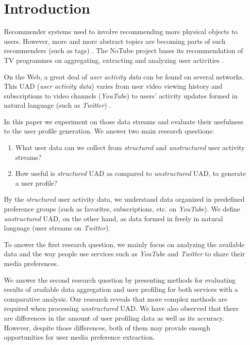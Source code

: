 \section{Introduction}

Recommender systems used to involve recommending more physical objects \cite{combining-cf-with-pa} to users.
However, more and more abstract topics are becoming parts of such recommenders (such as tags) \cite{accuracy-recommending}. The NoTube project bases its recommendation of TV programmes on aggregating,
extracting and analyzing user activities \cite{notube-main}.

On the Web, a great deal of \textit{user activity data} can be found on several networks. This UAD (\textit{user activity data}) varies from user video viewing history and subscriptions to video channels (\eg \textit{YouTube}) to users' activity updates formed in natural language (such as \textit{Twitter}) \cite{why-we-twitter}.

In this paper we experiment on those data streams and evaluate their usefulness to the user profile generation. We answer
two main research questions:
\begin{enumerate}
  \item What user data can we collect from \textit{structured} and \textit{unstructured} user activity streams?
  \item How useful is \textit{structured} UAD as compared to \textit{unstructured} UAD, to generate a user profile?
\end{enumerate}

By the \textit{structured} user activity data, we understand data organized in predefined
preference groups (such as favorites, subscriptions, etc. on \textit{YouTube}).
We define \textit{unstructured} UAD, on the other hand, as data formed in freely in
natural language (user streams on \textit{Twitter}).

To answer the first research question, we mainly focus on analyzing the available
data and the way people use services such as \textit{YouTube} and \textit{Twitter} to share
their media preferences.

We answer the second research question by presenting methods for evaluating results of
available data aggregation and user profiling for both services with a comparative analysis.
Our research reveals that more complex methods are required when processing \textit{unstructured} UAD.
We have also observed that there are differences in the amount of user profiling data as well as its
accuracy. However, despite those differences, both of them may provide
enough opportunities for user media preference extraction.

